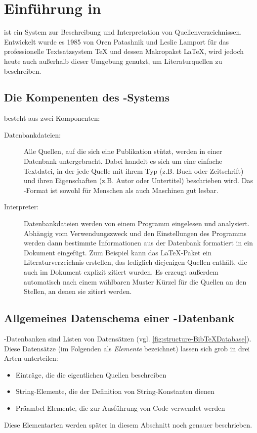 \section{Einführung in \mbox{\BibTeX}}
\label{sec:einfuehrung-in-bibtex}

\BibTeX{} ist ein System zur Beschreibung und Interpretation von
Quellenverzeichnissen.
Entwickelt wurde es 1985 von Oren Patashnik und Leslie Lamport für das
professionelle Textsatzsystem \TeX{} und dessen Makropaket \LaTeX, wird jedoch
heute auch außerhalb dieser Umgebung genutzt, um Literaturquellen zu
beschreiben.\cite{wiki:BibTeX}

\subsection{Die Kompenenten des \mbox{\BibTeX-}Systems}
\noindent\BibTeX{} besteht aus zwei Komponenten:
\begin{description}
    \item[Datenbankdateien:] Alle Quellen, auf die sich eine Publikation
        stützt, werden in einer Datenbank untergebracht. Dabei handelt es sich
        um eine einfache Textdatei, in der jede Quelle mit ihrem Typ (z.B. Buch
        oder Zeitschrift) und ihren Eigenschaften (z.B. Autor oder Untertitel)
        beschrieben wird. Das \mbox{\BibTeX-}Format ist sowohl für Menschen als
        auch Maschinen gut lesbar.
    \item[Interpreter:] Datenbankdateien werden von einem Programm eingelesen
        und analysiert. Abhängig vom Verwendungszweck und den Einstellungen des
        Programms werden dann bestimmte Informationen aus der Datenbank
        formatiert in ein Dokument eingefügt. Zum Beispiel kann das
        \mbox{\LaTeX-}Paket  ein Literaturverzeichnis erstellen,
        das lediglich diejenigen Quellen enthält, die auch im Dokument explizit
        zitiert wurden. Es erzeugt außerdem automatisch nach einem wählbaren
        Muster Kürzel für die Quellen an den Stellen, an denen sie zitiert
        werden.
\end{description}

\subsection{Allgemeines Datenschema einer \mbox{\BibTeX-}Datenbank}

\mbox{\BibTeX-}Datenbanken sind Listen von Datensätzen (vgl.
\autoref{fig:structure-BibTeXDatabase}). Diese Datensätze (im Folgenden als
\emph{Elemente} bezeichnet) lassen sich grob in drei Arten unterteilen:
\begin{itemize}
    \item Einträge, die die eigentlichen Quellen beschreiben
    \item String-Elemente, die der Definition von String-Konstanten dienen
    \item Präambel-Elemente, die zur Ausführung von Code verwendet werden
\end{itemize}
Diese Elementarten werden später in diesem Abschnitt noch genauer beschrieben.

